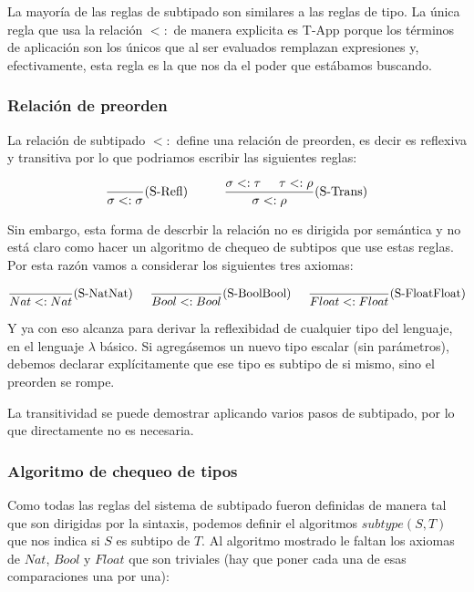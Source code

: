 La mayoría de las reglas de subtipado son similares a las reglas de tipo. La  única regla que usa la relación $<:$ de manera explicita es T-App porque los términos de aplicación son los únicos que al ser evaluados remplazan expresiones y, efectivamente, esta regla es la que nos da el poder que estábamos buscando.


\subsubsection{Relación de preorden} La relación de subtipado $<:$ define una relación de preorden, es decir es reflexiva y transitiva por lo que podriamos escribir las siguientes reglas:

$$\frac{}{\sigma <: \sigma}(\text{S-Refl}) \hspace*{1cm}\frac{\sigma <:\tau\hspace*{5mm}\tau <: \rho}{\sigma <: \rho}(\text{S-Trans})$$

Sin embargo, esta forma de descrbir la relación no es dirigida por semántica y no está claro como hacer un algoritmo de chequeo de subtipos que use estas reglas. Por esta razón vamos a considerar los siguientes tres axiomas:

\begin{align*}
\frac{}{Nat <: Nat}(\text{S-NatNat}) \hspace*{5mm}\frac{}{Bool <: Bool}(\text{S-BoolBool}) \hspace*{5mm}\frac{}{Float <: Float}(\text{S-FloatFloat})
\end{align*}

\vspace*{5mm}
Y ya con eso alcanza para derivar la reflexibidad de cualquier tipo del lenguaje, en el lenguaje $\lambda$ básico. Si agregásemos un nuevo tipo escalar (sin parámetros),  debemos declarar explícitamente que ese tipo es subtipo de si mismo, sino el preorden se rompe.

La transitividad se puede demostrar aplicando varios pasos de subtipado, por lo que directamente no es necesaria.

\subsubsection{Algoritmo de chequeo de tipos}
Como todas las reglas del sistema de subtipado fueron definidas de manera tal que son dirigidas por la sintaxis, podemos definir el algoritmos $subtype(S,T)$ que nos indica si $S$ es subtipo de $T$. Al algoritmo mostrado le faltan los axiomas de $Nat$, $Bool$ y $Float$ que son triviales (hay que poner cada una de esas comparaciones una por una):

